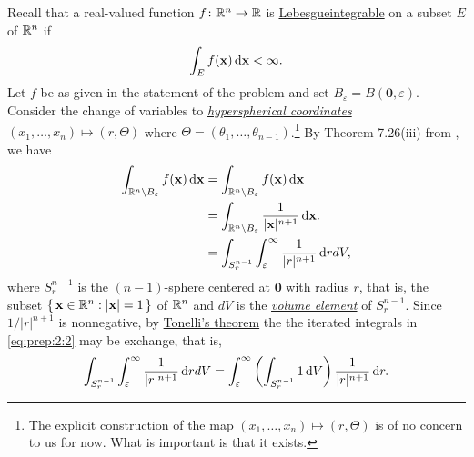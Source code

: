 \begin{solution}
Recall that a real-valued function $f\colon\mathbb{R}^n\to\mathbb{R}$ is
\href{https://en.wikipedia.org/wiki/Fubini's_theorem#Tonelli.27s_theorem_for_non-negative_functions}{Lebesgueintegrable}
on a subset $E$ of $\mathbb{R}^n$ if
\begin{equation}
\label{eq:prep:2:1}
\int_E f(\mathbf{x})\mathop{}\!\mathrm{d}\mathbf{x}<\infty.
\end{equation}
Let $f$ be as given in the statement of the problem and set
$B_\varepsilon= B(\mathbf{0},\varepsilon)$. Consider
the change of variables to
\href{https://en.wikipedia.org/wiki/N-sphere#Spherical_coordinates}{\emph{hyperspherical
    coordinates}} $(x_1,\dotsc,x_n)\mapsto(r,\Theta)$ where
$\Theta=(\theta_1,\dotsc,\theta_{n-1})$.\footnote{The explicit construction
  of the map $(x_1,\dotsc,x_n)\mapsto(r,\Theta)$ is of no concern to us for
  now. What is important is that it exists.} By Theorem 7.26(iii) from
\cite[Ch.\@ 7, p.\@ 123]{rudin-2}, we have
\begin{equation}
\label{eq:prep:2:2}
\begin{aligned}
\int_{\mathbb{R}^n\setminus B_\varepsilon}f(\mathbf{x})\mathop{}\!\mathrm{d}\mathbf{x}
&=\int_{\mathbb{R}^n\setminus B_\varepsilon} f(\mathbf{x})\mathop{}\!\mathrm{d}\mathbf{x}\\
&=\int_{\mathbb{R}^n\setminus
  B_\varepsilon}\frac{1}{|\mathbf{x}|^{n+1}}\mathop{}\!\mathrm{d}\mathbf{x}.\\
&=\int_{S^{n-1}_r}\int_\varepsilon^\infty\frac{1}{|r|^{n+1}} \mathop{}\!\mathrm{d} r dV,
\end{aligned}
\end{equation}
where $S_r^{n-1}$ is the $(n-1)$-sphere centered at $\mathbf{0}$ with
radius $r$, that is, the subset $\left\{\,\mathbf{x}\in\mathbb{R}^n:|\mathbf{x}|=1\,\right\}$
of $\mathbb{R}^n$ and $dV$ is the
\href{https://en.wikipedia.org/wiki/Volume_element}{\emph{volume element}}
of $S_r^{n-1}$. Since $1/|r|^{n+1}$ is nonnegative, by
\href{https://en.wikipedia.org/wiki/Fubini's_theorem#Tonelli.27s_theorem}{Tonelli's
  theorem} the the iterated integrals in \eqref{eq:prep:2:2} may be
exchange, that is,
\begin{equation}
  \label{eq:prep:2:3}
\int_{S^{n-1}_r}\int_\varepsilon^\infty\frac{1}{|r|^{n+1}} \mathop{}\!\mathrm{d} r dV=
\int_\varepsilon^\infty\left(\int_{S_r^{n-1}}1\mathop{}\!\mathrm{d}
  V\right)\frac{1}{|r|^{n+1}}\mathop{}\!\mathrm{d} r.
\end{equation}


\end{solution}

